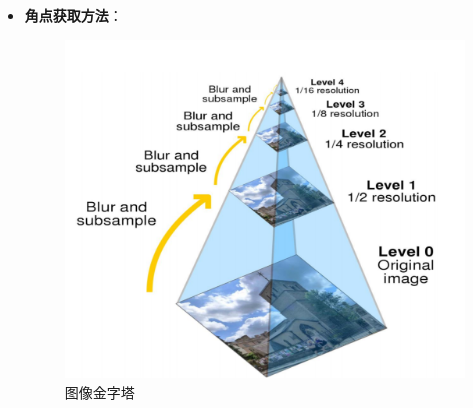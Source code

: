\documentclass[../main.tex]{subfiles}
\begin{document}
\begin{enumerate}
\begin{itemize}
\begin{enumerate}
\begin{itemize}
\begin{itemize}
\begin{itemize}
                                            \item \textbf{角点获取方法}：
                                                \begin{figure}[H]
                                                    \centering
                                                    \begin{minipage}[t]{0.35\textwidth}
                                                        \centering
                                                        \includegraphics[width=\textwidth]{images/orb2.png}
                                                        \caption{图像金字塔}
                                                        \label{fig:orb_pyramid}
                                                    \end{minipage}
                                                    \begin{minipage}[t]{0.35\textwidth}
                                                        \centering

\end{minipage}
\end{figure}
\end{itemize}
\end{itemize}
\end{itemize}
\end{enumerate}
\end{itemize}
\end{enumerate}
\end{document}
